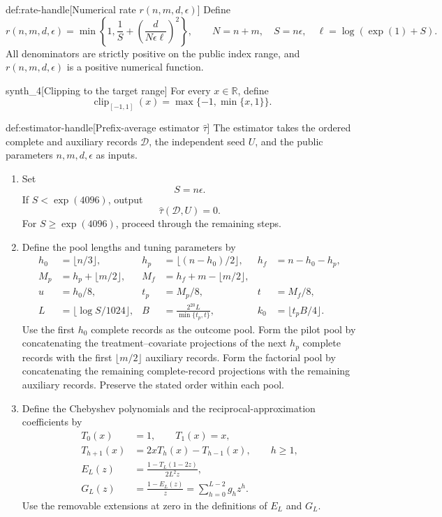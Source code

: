\documentclass[11pt]{article}
\begin{document}
\begin{definitionv}{def:rate-handle}[Numerical rate $r(n,m,d,\epsilon)$]
Define
\[
r(n,m,d,\epsilon)
=
\min\left\{
1,\frac1S+\left(\frac d{N\epsilon\ell}\right)^2
\right\},
\qquad
N=n+m,\quad S=n\epsilon,\quad
\ell=\log(\exp(1)+S).
\]
All denominators are strictly positive on the public index range, and \(r(n,m,d,\epsilon)\) is a positive numerical function.
\end{definitionv}

\begin{definitionv}{synth_4}[Clipping to the target range]
For every \(x\in\mathbb R\), define
\[
\operatorname{clip}_{[-1,1]}(x)=\max\{-1,\min\{x,1\}\}.
\]
\end{definitionv}

\begin{algorithmv}{def:estimator-handle}[Prefix-average estimator $\widehat\tau$]
The estimator takes the ordered complete and auxiliary records \(\mathcal D\), the independent seed \(U\), and the public parameters \(n,m,d,\epsilon\) as inputs.
\begin{enumerate}
\item Set
\[
S=n\epsilon.
\]
If \(S<\exp(4096)\), output
\[
\widehat\tau(\mathcal D,U)=0.
\]
For \(S\ge\exp(4096)\), proceed through the remaining steps.

\item Define the pool lengths and tuning parameters by
\[
\begin{aligned}
h_0&=\lfloor n/3\rfloor,
&
h_p&=\lfloor(n-h_0)/2\rfloor,
&
h_f&=n-h_0-h_p,\\
M_p&=h_p+\lfloor m/2\rfloor,
&
M_f&=h_f+m-\lfloor m/2\rfloor,\\
u&=h_0/8,
&
t_p&=M_p/8,
&
t&=M_f/8,\\
L&=\lfloor\log S/1024\rfloor,
&
B&=\frac{2^{20}L}{\min\{t_p,t\}},
&
k_0&=\lfloor t_pB/4\rfloor.
\end{aligned}
\]
Use the first \(h_0\) complete records as the outcome pool. Form the pilot pool by concatenating the treatment--covariate projections of the next \(h_p\) complete records with the first \(\lfloor m/2\rfloor\) auxiliary records. Form the factorial pool by concatenating the remaining complete-record projections with the remaining auxiliary records. Preserve the stated order within each pool.

\item Define the Chebyshev polynomials and the reciprocal-approximation coefficients by
\[
\begin{aligned}
T_0(x)&=1,\qquad T_1(x)=x,\\
T_{h+1}(x)&=2xT_h(x)-T_{h-1}(x),\qquad h\ge1,\\
E_L(z)&=\frac{1-T_L(1-2z)}{2L^2z},\\
G_L(z)&=\frac{1-E_L(z)}z
=\sum_{h=0}^{L-2}g_hz^h.
\end{aligned}
\]
Use the removable extensions at zero in the definitions of \(E_L\) and \(G_L\).


\end{enumerate}
\end{algorithmv}
\end{document}
